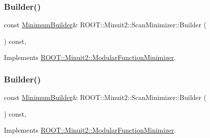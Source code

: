 \mbox{\label{classROOT_1_1Minuit2_1_1ScanMinimizer_a6ca4b63ec20ed8dd310e02d427ef05fa}} 
\subsubsection{\texorpdfstring{Builder()}{Builder()}\hspace{0.1cm}{\footnotesize\ttfamily [2/3]}}
{\footnotesize\ttfamily const \mbox{\hyperlink{classROOT_1_1Minuit2_1_1MinimumBuilder}{Minimum\+Builder}}\& R\+O\+O\+T\+::\+Minuit2\+::\+Scan\+Minimizer\+::\+Builder (\begin{DoxyParamCaption}{ }\end{DoxyParamCaption}) const\hspace{0.3cm}{\ttfamily [inline]}, {\ttfamily [virtual]}}



Implements \mbox{\hyperlink{classROOT_1_1Minuit2_1_1ModularFunctionMinimizer_a13e98551cf14e927c61e1e34ecf8ba8b}{R\+O\+O\+T\+::\+Minuit2\+::\+Modular\+Function\+Minimizer}}.

\mbox{\label{classROOT_1_1Minuit2_1_1ScanMinimizer_a6ca4b63ec20ed8dd310e02d427ef05fa}} 
\subsubsection{\texorpdfstring{Builder()}{Builder()}\hspace{0.1cm}{\footnotesize\ttfamily [3/3]}}
{\footnotesize\ttfamily const \mbox{\hyperlink{classROOT_1_1Minuit2_1_1MinimumBuilder}{Minimum\+Builder}}\& R\+O\+O\+T\+::\+Minuit2\+::\+Scan\+Minimizer\+::\+Builder (\begin{DoxyParamCaption}{ }\end{DoxyParamCaption}) const\hspace{0.3cm}{\ttfamily [inline]}, {\ttfamily [virtual]}}



Implements \mbox{\hyperlink{classROOT_1_1Minuit2_1_1ModularFunctionMinimizer_a13e98551cf14e927c61e1e34ecf8ba8b}{R\+O\+O\+T\+::\+Minuit2\+::\+Modular\+Function\+Minimizer}}.

